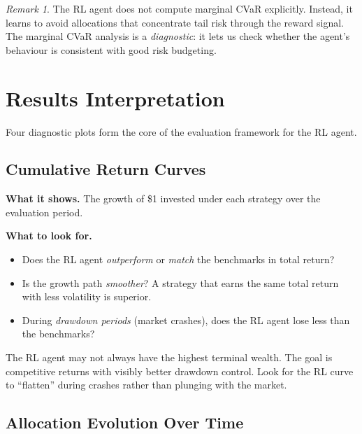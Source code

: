 \documentclass[11pt, a4paper]{article}
\theoremstyle{definition}
\theoremstyle{plain}
\theoremstyle{remark}
\newtheorem{remark}{Remark}[section]
\begin{document}
\begin{remark}
The RL agent does not compute marginal CVaR explicitly. Instead, it
learns to avoid allocations that concentrate tail risk through the reward
signal. The marginal CVaR analysis is a \emph{diagnostic}: it lets us
check whether the agent's behaviour is consistent with good risk
budgeting.
\end{remark}


\section{Results Interpretation}
\label{sec:results}

Four diagnostic plots form the core of the evaluation framework for
the RL agent.

\subsection{Cumulative Return Curves}

\textbf{What it shows.} The growth of \$1 invested under each strategy
over the evaluation period.

\textbf{What to look for.}
\begin{itemize}[leftmargin=2em]
    \item Does the RL agent \emph{outperform} or \emph{match} the
          benchmarks in total return?
    \item Is the growth path \emph{smoother}? A strategy that earns the
          same total return with less volatility is superior.
    \item During \emph{drawdown periods} (market crashes), does the RL
          agent lose less than the benchmarks?
\end{itemize}

\begin{keyresult}
The RL agent may not always have the highest terminal wealth. The
goal is competitive returns with visibly better drawdown control.
Look for the RL curve to ``flatten'' during crashes rather than
plunging with the market.
\end{keyresult}

\subsection{Allocation Evolution Over Time}
\end{document}
